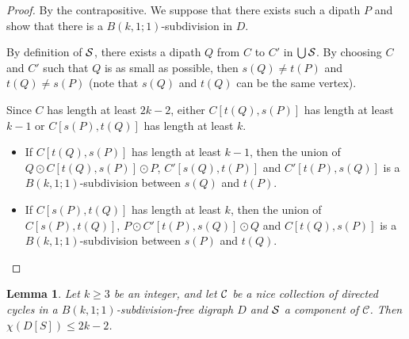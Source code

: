 \documentclass[utf8,10pt]{article}
\theoremstyle{plain}
\newtheorem{lemma}[theorem]{Lemma}
\theoremstyle{definition}
\theoremstyle{remark}
\begin{document}
\begin{proof}
By the contrapositive. We suppose that there exists such a dipath $P$ and show that there is a $B(k,1;1)$-subdivision in $D$.

By definition of ${\cal S}$, there exists a dipath $Q$ from $C$ to $C'$ in $\bigcup {\cal S}$. By choosing $C$ and $C'$ such that 
$Q$ is as small as possible, then $s(Q) \not = t(P)$ and $t(Q) \not = s(P)$ (note that $s(Q)$ and $t(Q)$ can be the same vertex). 

Since $C$ has length at least $2k-2$, either $C[t(Q), s(P)]$ has length at least $k-1$ or $C[s(P), t(Q)]$ has length at least $k$. 

\begin{itemize}
	\item If $C[t(Q), s(P)]$ has length at least $k-1$, then the union of $Q \odot C[t(Q), s(P)] \odot P$, $C'[s(Q), t(P)]$ and $C'[ t(P), s(Q)]$
	is a $B(k,1;1)$-subdivision between $s(Q)$ and $t(P)$. 
	\item If $C[s(P), t(Q)]$ has length at least $k$, then the union of $C[s(P), t(Q)]$, $P \odot C'[t(P), s(Q)] \odot Q$ and $C[t(Q), s(P)]$
	is a $B(k,1;1)$-subdivision between $s(P)$ and $t(Q)$. 
\end{itemize}
\end{proof}


\begin{lemma}\label{lem:compo1}
Let $k\geq 3$ be an integer, and let ${\cal C}$ be a nice collection of directed cycles in a $B(k,1;1)$-subdivision-free digraph $D$ and ${\cal S}$ a component of $\mathcal{C}$. Then $\chi(D[S]) \leq 2k-2$.	 
\end{lemma}
\end{document}
